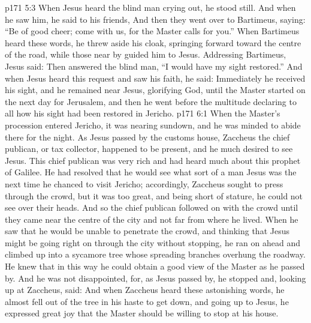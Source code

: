 \vs p171 5:3 When Jesus heard the blind man crying out, he stood still. And when he saw him, he said to his friends,  And then they went over to Bartimeus, saying: “Be of good cheer; come with us, for the Master calls for you.” When Bartimeus heard these words, he threw aside his cloak, springing forward toward the centre of the road, while those near by guided him to Jesus. Addressing Bartimeus, Jesus said:  Then answered the blind man, “I would have my sight restored.” And when Jesus heard this request and saw his faith, he said:  Immediately he received his sight, and he remained near Jesus, glorifying God, until the Master started on the next day for Jerusalem, and then he went before the multitude declaring to all how his sight had been restored in Jericho.
\vs p171 6:1 When the Master’s procession entered Jericho, it was nearing sundown, and he was minded to abide there for the night. As Jesus passed by the customs house, Zaccheus the chief publican, or tax collector, happened to be present, and he much desired to see Jesus. This chief publican was very rich and had heard much about this prophet of Galilee. He had resolved that he would see what sort of a man Jesus was the next time he chanced to visit Jericho; accordingly, Zaccheus sought to press through the crowd, but it was too great, and being short of stature, he could not see over their heads. And so the chief publican followed on with the crowd until they came near the centre of the city and not far from where he lived. When he saw that he would be unable to penetrate the crowd, and thinking that Jesus might be going right on through the city without stopping, he ran on ahead and climbed up into a sycamore tree whose spreading branches overhung the roadway. He knew that in this way he could obtain a good view of the Master as he passed by. And he was not disappointed, for, as Jesus passed by, he stopped and, looking up at Zaccheus, said:  And when Zaccheus heard these astonishing words, he almost fell out of the tree in his haste to get down, and going up to Jesus, he expressed great joy that the Master should be willing to stop at his house.
